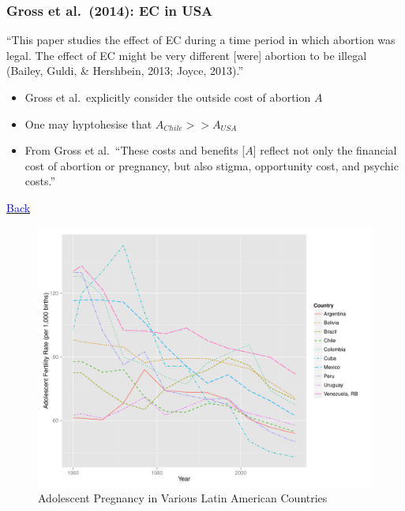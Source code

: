 \documentclass[10pt,letterpaper,subeqn]{beamer}
\begin{document}
\begin{frame}[label=GrossEtAl]
\frametitle{Gross et al.\ (2014): EC in USA}
``This paper studies the effect of EC during a time period in which abortion was legal. 
The effect of EC might be very different [were] abortion to be illegal 
(Bailey, Guldi, \& Hershbein, 2013; Joyce, 2013).''
\vspace{6mm}
\begin{itemize}
\item Gross et al.\ explicitly consider the outside cost of abortion $A$
\item One may hyptohesise that $A_{Chile}>>A_{USA}$
\item From Gross et al.\ ``These costs and benefits [$A$] reflect not only the financial 
cost of abortion or pregnancy, but also stigma, opportunity cost, and psychic costs.''
\vspace{7mm}
\end{itemize}
\hyperlink{empirA3}{\textcolor{blue}{Back}}
\end{frame}

\begin{frame}[label=coun]
\begin{figure}
\begin{center}
\caption{Adolescent Pregnancy in Various Latin American Countries}
\includegraphics[scale=0.45]{./figures/Countries.pdf}
\end{center}
\end{figure}
\end{frame}
\end{document}
